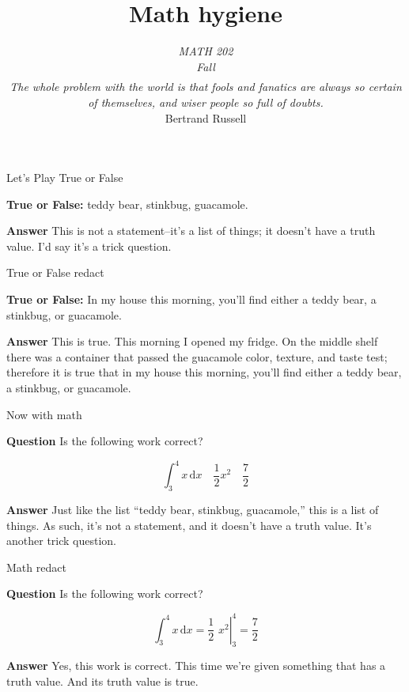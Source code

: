 \documentclass[fleqn]{beamer}
\subtitle{\emph{MATH 202} \\ \emph{Fall \the\year}  \\ $\phantom{xxx}$ \\ 
\emph{The whole problem with the world is that fools and fanatics are 
always so certain of themselves, and wiser people so full of doubts.} \\ \vspace{0.25in} Bertrand Russell}
\title{\textbf{Math hygiene}}
\date{}
\theoremstyle{definition}
\begin{document}
\frame{\titlepage}

\begin{frame}{Let's Play True or False}

    \textbf{True or False:} teddy bear, stinkbug, guacamole.

    \vspace{0.5in}
    \textbf{Answer} This is not a statement--it's a list of things; it doesn't 
    have a truth value. I'd say it's a trick question.

\vfill 
\end{frame}

\begin{frame}{True or False redact}

  \textbf{True or False:} In my house this morning, you'll 
  find either a teddy bear, a stinkbug, or guacamole.

  \vspace{0.5in}
  \textbf{Answer} This is true. This morning I opened my fridge. On the
  middle shelf there was a container that passed the guacamole color,
  texture, and taste test; therefore it is true that in my house this morning, you'll 
  find either a teddy bear, a stinkbug, or guacamole.

\vfill 
\end{frame}

\begin{frame}{Now with math}

  \textbf{Question} Is the following work correct?

  \begin{equation*}
    \int_3^4 x \, \mathrm{d}x \quad 
     \frac{1}{2} x^{2} \quad \frac{7}{2}
  \end{equation*}

  \vspace{0.5in}
  \textbf{Answer} Just like the list ``teddy bear, stinkbug, 
  guacamole,''
  this is a list of things. As such, it's not 
  a statement, and it doesn't have a truth value. It's another trick 
  question.
  \vfill 
\end{frame}

\begin{frame}{Math redact}

  \textbf{Question} Is the following work correct?

  \begin{equation*}
    \int_3^4 x \, \mathrm{d}x =
     \left. \frac{1}{2} \,\, x^{2} \right |_{3}^4 = \frac{7}{2}
  \end{equation*}

  \vspace{0.5in}
  \textbf{Answer} Yes, this work is correct. This time we're 
  given something that has a truth value. And its truth value is
  true.

  \vfill
\end{frame}
\end{document}
